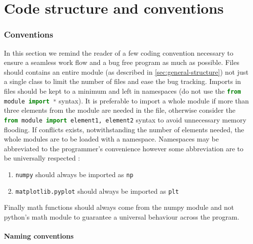 \documentclass[]{article}
\begin{document}
\newpage
\part{Code structure and conventions}\label{sec:code-structure-and-conventions}

\section{Conventions}\label{sec:conventions}

In this section we remind the reader of a few coding convention necessary to ensure a seamless work flow and a bug free program as much as possible.
Files should contains an entire module (as described in \ref{sec:general-structure}) not just a single class to limit the number of files and ease the bug tracking.
Imports in files should be kept to a minimum and left in namespaces (do not use the \lstinline[columns=fixed,language=Python]|from module import *| syntax). It is preferable to import a whole module if more than three elements from the module are needed in the file, otherwise consider the \lstinline[columns=fixed,language=Python]|from module import element1, element2| syntax to avoid unnecessary memory flooding. If conflicts exists, notwithstanding the number of elements needed, the whole modules are to be loaded with a namespace.
Namespaces may be abbreviated to the programmer's convenience however some abbreviation are to be universally respected :
\begin{enumerate}[label=(\roman*)]
	\item \texttt{numpy} should always be imported as \texttt{np}
	\item \texttt{matplotlib.pyplot} should always be imported as \texttt{plt}
\end{enumerate}

Finally math functions should always come from the numpy module and not python's math module to guarantee a universal behaviour across the program.

\subsection{Naming conventions}\label{sec:naming-conventions}
\end{document}
